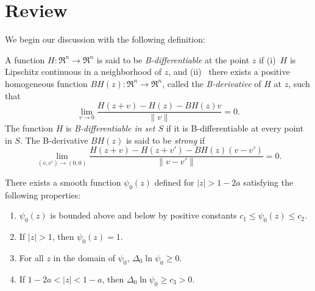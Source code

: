 \section{Review}
\label{computation}

We begin our discussion with the following definition:

\begin{defn}

A function $H\colon  \Re^n \to \Re^n$ is said to be {\em
B-differentiable\/} at the point $z$ if (i)~$H$ is Lipschitz
continuous in a neighborhood of $z$, and (ii)~ there exists a positive
homogeneous function $BH(z)\colon  \Re^n \to \Re^n$, called the {\em
B-derivative\/} of $H$ at $z$, such that
\[ \lim_{v \to 0} \frac{H(z+v) - H(z) - BH(z)v}{\| v \|} = 0. \]
The function $H$ is {\em B-differentiable in  set $S$} if it is B-differentiable
at every point in $S$.
The B-derivative $BH(z)$ is said to be {\em strong\/} if
\[ \lim_{(v,v') \to (0,0)} \frac{H(z+v) - H(z+v') - BH(z)(v
 -v')}{\| v - v' \|}
   = 0. \]
\end{defn}


\begin{lem}\label{limbog} There exists a smooth function $\psi_0(z)$
defined for $|z|>1-2a$ satisfying the following properties\rom:
\begin{enumerate}
\renewcommand{\labelenumi}{(\roman{enumi})}
\item $\psi_0(z)$ is bounded above and below by positive constants
$c_1\leq \psi_0(z)\leq c_2$.
\item If $|z|>1$, then $\psi_0(z)=1$.
\item For all $z$ in the domain of $\psi_0$, $\Delta_0\ln \psi_0\geq 0$.
\item If $1-2a<|z|<1-a$, then $\Delta_0\ln \psi_0\geq
c_3>0$.
\end{enumerate}
\end{lem}

